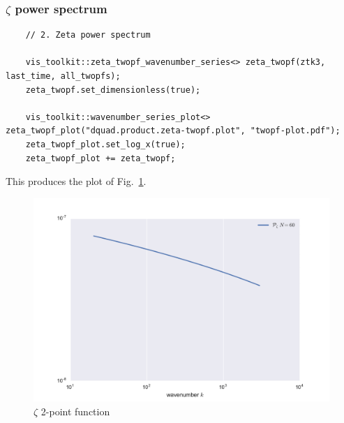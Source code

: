 \documentclass[11pt,a4paper]{article}
\begin{document}
\subsubsection{$\zeta$ power spectrum}
\begin{verbatim}
    // 2. Zeta power spectrum

    vis_toolkit::zeta_twopf_wavenumber_series<> zeta_twopf(ztk3, last_time, all_twopfs);
    zeta_twopf.set_dimensionless(true);

    vis_toolkit::wavenumber_series_plot<> zeta_twopf_plot("dquad.product.zeta-twopf.plot", "twopf-plot.pdf");
    zeta_twopf_plot.set_log_x(true);
    zeta_twopf_plot += zeta_twopf;
\end{verbatim}
This produces the plot of Fig.~\ref{fig:twopf-plot}.
\begin{figure}
    \begin{center}
        \includegraphics[scale=0.75]{Outputs/twopf-plot}
    \end{center}
    \caption{\label{fig:twopf-plot}$\zeta$ 2-point function}
\end{figure}
\end{document}
